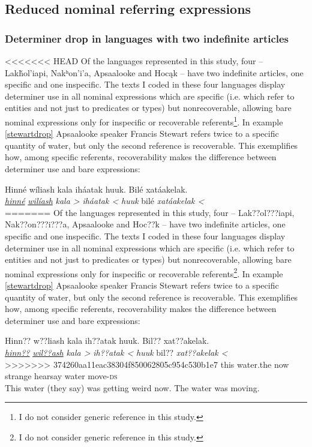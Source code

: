 \documentclass[output=paper]{LSP/langsci}
\begin{document}
\subsection{Reduced nominal referring expressions}\label{nominalreduction}

\subsubsection{Determiner drop in languages with two indefinite articles}\label{droptwoindef}

<<<<<<< HEAD
Of the languages represented in this study, four -- Lakȟol’iapi, Nakʰon’i’a, Apsaalooke and Hocąk -- have two indefinite articles, one specific and one inspecific. The texts I coded in these four languages display determiner use in all nominal expressions which are specific (i.e. which refer to entities and not just to predicates or types) but nonrecoverable, allowing bare nominal expressions only for inspecific or recoverable referents\footnote{I do not consider generic reference in this study.}. In example \ref{stewartdrop} Apsaalooke speaker Francis Stewart refers twice to a specific quantity of water, but only the second reference is recoverable. This exemplifies how, among specific referents, recoverability makes the difference between determiner use and bare expressions:

\ea\label{stewartdrop}
Hinné wíliash kala iháatak huuk. Bilé xatáakelak.\footnotemark\\
\gll	\emph{\underline{hinné}} 	\emph{\underline{wilíash}} 		\emph{kala >} 	\emph{iháatak <}		\emph{huuk} 	bilé 		\emph{xatáakelak <}\\
=======
Of the languages represented in this study, four -- Lak??ol???iapi, Nak??on???i???a, Apsaalooke and Hoc??k -- have two indefinite articles, one specific and one inspecific. The texts I coded in these four languages display determiner use in all nominal expressions which are specific (i.e. which refer to entities and not just to predicates or types) but nonrecoverable, allowing bare nominal expressions only for inspecific or recoverable referents\footnote{I do not consider generic reference in this study.}. In example \ref{stewartdrop} Apsaalooke speaker Francis Stewart refers twice to a specific quantity of water, but only the second reference is recoverable. This exemplifies how, among specific referents, recoverability makes the difference between determiner use and bare expressions:

\ea\label{stewartdrop}
Hinn?? w??liash kala ih??atak huuk. Bil?? xat??akelak.\footnotemark\\
\gll	\emph{\underline{hinn??}} 	\emph{\underline{wil??ash}} 		\emph{kala >} 	\emph{ih??atak <}		\emph{huuk} 	bil?? 		\emph{xat??akelak <}\\
>>>>>>> 374260aa11eac38304f850062805c954c530b1e7
	this 				water.the 					now 			strange 			hearsay 		water		move-\textsc{ds}\\
\glt	This water (they say) was getting weird now. The water was moving.
\z
\end{document}
